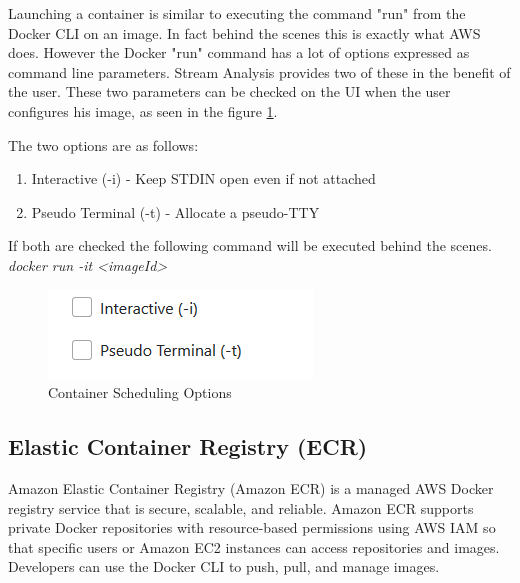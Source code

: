 Launching a container is similar to executing the command "run" from the Docker CLI on an image. In fact behind the scenes this is exactly what AWS does. However the Docker "run" command has a lot of options expressed as command line parameters. Stream Analysis provides two of these in the benefit of the user. These two parameters can be checked on the UI when the user configures his image, as seen in the figure \ref{fig:dockerOptions}.

The two options are as follows:

\begin{enumerate}
	\item Interactive (-i) - Keep STDIN open even if not attached
	\item Pseudo Terminal (-t) - Allocate a pseudo-TTY
\end{enumerate}

If both are checked the following command will be executed behind the scenes.\\

\textit{docker run -it <imageId>}\\

\begin{figure}[h]
	\centering
	\includegraphics[width=1\linewidth]{./images/webapp/dockerOptions.PNG}
	\caption{Container Scheduling Options}
	\label{fig:dockerOptions}
\end{figure}

\subsection{Elastic Container Registry (ECR)}
\label{chap:04:03:02}

Amazon Elastic Container Registry (Amazon ECR) is a managed AWS Docker registry service that is secure, scalable, and reliable. Amazon ECR supports private Docker repositories with resource-based permissions using AWS IAM so that specific users or Amazon EC2 instances can access repositories and images. Developers can use the Docker CLI to push, pull, and manage images.\cite{aws-ecr}

